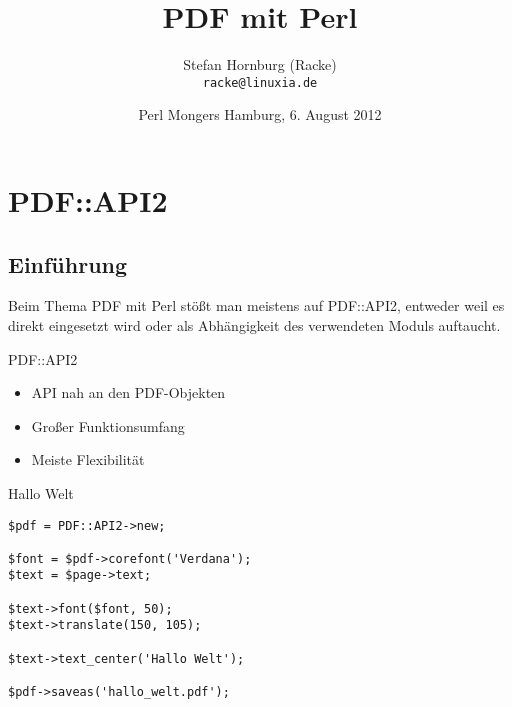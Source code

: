 \usepackage[utf8]{inputenc}
\usepackage[T1]{fontenc}
\usepackage{mathptmx}
\usepackage[scaled=.90]{helvet}
\usepackage{courier}

\usepackage{beamerthemesplit}
\usepackage{verbatim}
\usepackage{hyperref}
\usepackage{graphicx}

\usepackage{listings}
\lstset{language=Perl,basicstyle=\footnotesize,tabsize=3,showstringspaces=false}

\title{PDF mit Perl}
\author[racke]{Stefan Hornburg (Racke)\\ \texttt{racke@linuxia.de}}
\date[]{Perl Mongers Hamburg, 6. August 2012}


\maketitle{}

\begin{frame}
  \titlepage
\end{frame}

\tableofcontents

\section{PDF::API2}

\subsection{Einführung}

Beim Thema PDF mit Perl stößt man meistens auf PDF::API2,
entweder weil es direkt eingesetzt wird oder als Abhängigkeit
des verwendeten Moduls auftaucht.

\begin{frame}{PDF::API2}
\begin{itemize}
\item API nah an den PDF-Objekten
\item Großer Funktionsumfang
\item Meiste Flexibilität
\end{itemize}
\end{frame}

\begin{frame}[fragile]{Hallo Welt}
\begin{lstlisting}
$pdf = PDF::API2->new;

$font = $pdf->corefont('Verdana');
$text = $page->text;

$text->font($font, 50);
$text->translate(150, 105);

$text->text_center('Hallo Welt');

$pdf->saveas('hallo_welt.pdf');
\end{lstlisting}
\end{frame}

